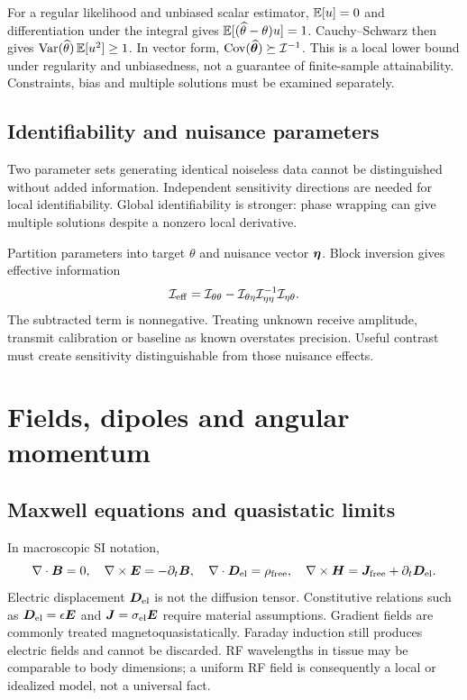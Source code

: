 For a regular likelihood and unbiased scalar estimator,
$\operatorname{\mathbb{E}}[u]=0$ and differentiation under the integral gives
$\operatorname{\mathbb{E}}[(\widehat\theta-\theta)u]=1$.
Cauchy--Schwarz then gives
$\operatorname{Var}(\widehat\theta)\operatorname{\mathbb{E}}[u^2]\geq1$.
In vector form,
$\operatorname{Cov}(\widehat{\bm{\theta}})\succeq\mathbf{\mathcal I}^{-1}$.
This is a local lower bound under regularity and unbiasedness, not a
guarantee of finite-sample attainability. Constraints, bias and
multiple solutions must be examined separately.

\subsection{Identifiability and nuisance parameters}
Two parameter sets generating identical noiseless data cannot be
distinguished without added information. Independent sensitivity directions
are needed for local identifiability. Global identifiability is stronger:
phase wrapping can give multiple solutions despite a nonzero local derivative.

Partition parameters into target $\theta$ and nuisance vector $\bm{\eta}$.
Block inversion gives effective information
\[
 \mathcal I_{\mathrm{eff}}=\mathcal I_{\theta\theta}
 -\mathbf{\mathcal I}_{\theta\eta}\mathbf{\mathcal I}_{\eta\eta}^{-1}
  \mathbf{\mathcal I}_{\eta\theta}.
\]
The subtracted term is nonnegative. Treating unknown receive amplitude,
transmit calibration or baseline as known overstates precision.
Useful contrast must create sensitivity distinguishable from those
nuisance effects.

\section{Fields, dipoles and angular momentum}
\label{sec:01:fields-dipoles-and-angular-momentum}
\subsection{Maxwell equations and quasistatic limits}
In macroscopic SI notation,
\[
 \nabla\cdot\bm{B}=0,\quad \nabla\times\bm{E}=-\partial_t\bm{B},\quad
 \nabla\cdot\bm{D}_{\rm el}=\rho_{\rm free},\quad
 \nabla\times\bm{H}=\bm{J}_{\rm free}+\partial_t\bm{D}_{\rm el}.
\]
Electric displacement $\bm{D}_{\rm el}$ is not the diffusion tensor.
Constitutive relations such as $\bm{D}_{\rm el}=\epsilon\bm{E}$ and
$\bm{J}=\sigma_{\rm el}\bm{E}$ require material assumptions.
Gradient fields are commonly treated magnetoquasistatically.
Faraday induction still produces electric fields and cannot be discarded.
RF wavelengths in tissue may be comparable to body dimensions; a uniform
RF field is consequently a local or idealized model, not a universal fact.


